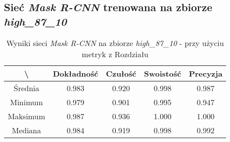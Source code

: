 \subsection{Sieć \textit{Mask R-CNN} trenowana na zbiorze \textit{high\_87\_10}}
\label{sec:results_high_original}

\begin{table}[H]
	\centering
	\caption{Wyniki sieci \textit{Mask R-CNN} na zbiorze \textit{high\_87\_10} - przy użyciu metryk z Rozdziału }
	\vspace{6pt}
	{\footnotesize
		\begin{tabular}{|c|c|c|c|c|}
      \hline \textbackslash & Dokładność & Czułość & Swoistość & Precyzja \\
      \hline Średnia & 0.983 & 0.920 & 0.998 & 0.987 \\
      \hline Minimum & 0.979 & 0.901 & 0.995 & 0.947 \\
      \hline Maksimum & 0.987 & 0.936 & 1.000 & 1.000 \\
      \hline Mediana & 0.984 & 0.919 & 0.998 & 0.992 \\
      \hline
		\end{tabular}
	}
  \vspace{0pt}
  \label{Tab:high_original_calculated}
\end{table}

